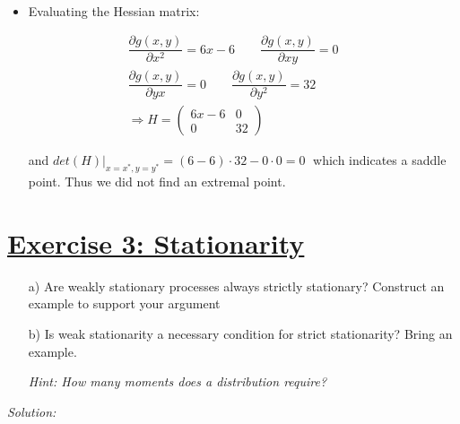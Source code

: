 \documentclass[12pt,a4paper]{article}
\newcommand{\tmpsection}[1]{}
\let\tmpsection=\section
\renewcommand{\section}[1]{\tmpsection{\underline{#1}} }
\begin{document}
\begin{itemize}
\begin{align*}
    \end{align*}
    \begin{itemize}
      \item Evaluating the Hessian matrix:
    \end{itemize}
    \begin{align*}
      \dfrac{\partial g(x,y)}{\partial x^2} = 6x- 6 \qquad  \dfrac{\partial g(x,y)}{\partial xy} = 0 \\
      \dfrac{\partial g(x,y)}{\partial yx} = 0  \qquad  \dfrac{\partial g(x,y)}{\partial y^2} = 32\\
      \Rightarrow H = 
      \begin{pmatrix}
        6x- 6 & 0 \\
        0 & 32
      \end{pmatrix}
    \end{align*}
    \begin{itemize}
      \item[] and $det(H)|_{x = x^{*}, y = y^{*}} = (6-6)  \cdot 32 - 0 \cdot 0 = 0 \;$ which indicates a saddle point. Thus we did not find an extremal point.
    \end{itemize}
\end{itemize}

\hypertarget{exercise-3-stationarity}{%
\section{Exercise 3: Stationarity}\label{exercise-3-stationarity}}

\begin{itemize}
    \item[a)] Are weakly stationary processes always strictly stationary? Construct an example to support your argument
    \item[b)] Is weak stationarity a necessary condition for strict stationarity? Bring an example.
    \item[] \textit{Hint: How many moments does a distribution require?}
\end{itemize}

\emph{Solution:}
\end{document}
